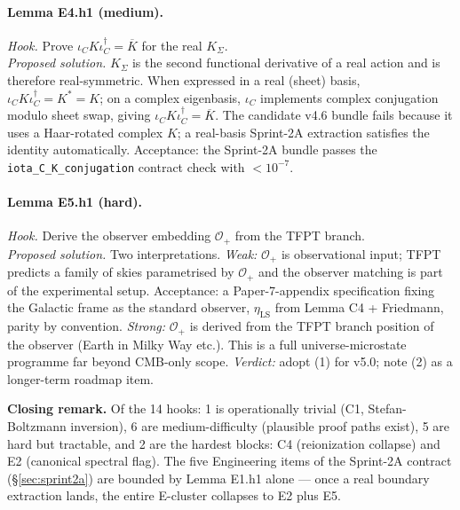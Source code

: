 \documentclass[11pt,a4paper]{article}
\begin{document}
\paragraph{Lemma E4.h1 (medium).}
\emph{Hook.}  Prove
\(\iota_C K\iota_C^\dagger=\overline{K}\) for the real
\(K_\Sigma\).\\
\emph{Proposed solution.}  \(K_\Sigma\) is the second functional
derivative of a real action and is therefore real-symmetric.  When
expressed in a real (sheet) basis,
\(\iota_C K\iota_C^\dagger=K^* = K\); on a complex eigenbasis,
\(\iota_C\) implements complex conjugation modulo sheet swap, giving
\(\iota_C K\iota_C^\dagger=\overline K\).  The candidate v4.6 bundle
fails because it uses a Haar-rotated complex \(K\); a real-basis
Sprint-2A extraction satisfies the identity automatically.
Acceptance: the Sprint-2A bundle passes the \texttt{iota\_C\_K\_conjugation}
contract check with \(<10^{-7}\).

\paragraph{Lemma E5.h1 (hard).}
\emph{Hook.}  Derive the observer embedding \(\mathcal O_+\) from the
TFPT branch.\\
\emph{Proposed solution.}  Two interpretations.
\emph{Weak:} \(\mathcal O_+\) is observational input; TFPT predicts a
family of skies parametrised by \(\mathcal O_+\) and the observer
matching is part of the experimental setup.  Acceptance: a
Paper-7-appendix specification fixing the Galactic frame as the
standard observer, \(\eta_{\mathrm{LS}}\) from Lemma C4 + Friedmann,
parity by convention.
\emph{Strong:} \(\mathcal O_+\) is derived from the TFPT branch
position of the observer (Earth in Milky Way etc.).  This is a full
universe-microstate programme far beyond CMB-only scope.
\emph{Verdict:} adopt (1) for v5.0; note (2) as a longer-term
roadmap item.

\bigskip

\noindent\textbf{Closing remark.}  Of the 14 hooks: 1 is operationally
trivial (C1, Stefan-Boltzmann inversion), 6 are medium-difficulty
(plausible proof paths exist), 5 are hard but tractable, and 2 are
the hardest blocks: C4 (reionization collapse) and E2 (canonical
spectral flag).  The five Engineering items of the Sprint-2A contract
(\S\ref{sec:sprint2a}) are bounded by Lemma E1.h1 alone --- once a
real boundary extraction lands, the entire E-cluster collapses to E2
plus E5.

\end{document}
